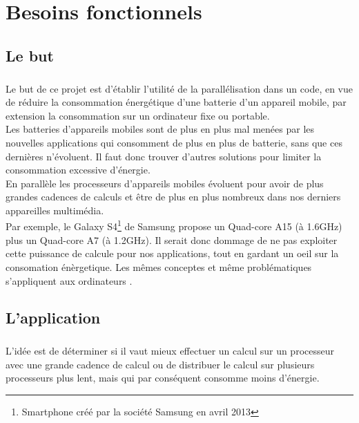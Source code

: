 \chapter{Besoins fonctionnels}

\section{Le but}
\paragraph{}
	Le but de ce projet est d'établir l'utilité de la parallélisation dans un code, en vue de réduire la consommation énergétique d'une batterie d'un appareil mobile, par extension la consommation sur un ordinateur fixe ou portable. \\

	Les batteries d'appareils mobiles sont de plus en plus mal menées par les nouvelles applications qui consomment de plus en plus de batterie, sans que ces dernières n'évoluent. Il faut donc trouver d'autres solutions pour limiter la consommation excessive d'énergie.\\

	En parallèle les processeurs d'appareils mobiles évoluent pour avoir de plus grandes cadences de calculs et être de plus en plus nombreux dans nos derniers appareilles multimédia.\\

	Par exemple, le Galaxy S4\footnote{Smartphone créé par la société Samsung en avril 2013} de Samsung propose un Quad-core A15 (à 1.6GHz) plus un Quad-core A7 (à 1.2GHz). Il serait donc dommage de ne pas exploiter cette puissance de calcule pour nos applications, tout en gardant un oeil sur la consomation énèrgetique. Les mêmes conceptes et même problématiques s'appliquent aux ordinateurs .\\

\section{L'application}
\paragraph{}
	L'idée est de déterminer si il vaut mieux effectuer un calcul sur un processeur avec une grande cadence de calcul ou de distribuer le calcul sur plusieurs processeurs plus lent, mais qui par conséquent consomme moins d'énergie. \\

